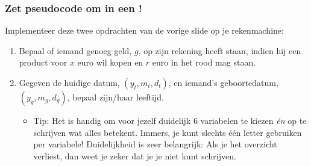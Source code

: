 \begin{frame}
\frametitle{Zet pseudocode om in een !}

Implementeer deze twee opdrachten van de vorige slide op je rekenmachine:

\begin{enumerate} 
  \item Bepaal of iemand genoeg geld, $g$, op zijn rekening heeft staan, indien hij een product voor $x$ euro wil kopen
  	en $r$ euro in het rood mag staan.
  \item Gegeven de huidige datum, $(y_t, m_t, d_t)$, en iemand's geboortedatum, $(y_g, m_g, d_g)$, bepaal zijn/haar leeftijd.
  \begin{itemize}
    \item Tip: Het is handig om voor jezelf duidelijk 6 variabelen te kiezen \emph{\'en} op te schrijven wat alles betekent.
    	Immers, je kunt slechts \'e\'en letter gebruiken per variabele! Duidelijkheid is zeer belangrijk:
    	Als je het overzicht verliest, dan weet je zeker dat je je  niet kunt schrijven.
  \end{itemize}
\end{enumerate}



\end{frame}





